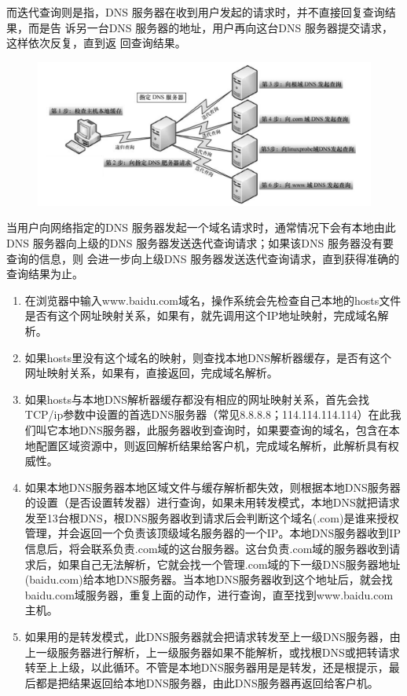 而迭代查询则是指，DNS 服务器在收到用户发起的请求时，并不直接回复查询结果，而是告
诉另一台DNS 服务器的地址，用户再向这台DNS 服务器提交请求，这样依次反复，直到返
回查询结果。
\begin{figure}[H]
	\centering
	\includegraphics[width=0.8\linewidth]{image/DNS}
\end{figure}
当用户向网络指定的DNS 服务器发起一个域名请求时，通常情况下会有本地由此DNS
服务器向上级的DNS 服务器发送迭代查询请求；如果该DNS 服务器没有要查询的信息，则
会进一步向上级DNS 服务器发送迭代查询请求，直到获得准确的查询结果为止。

\begin{enumerate}
	\item 在浏览器中输入www.baidu.com域名，操作系统会先检查自己本地的hosts文件是否有这个网址映射关系，如果有，就先调用这个IP地址映射，完成域名解析。
	
	\item  如果hosts里没有这个域名的映射，则查找本地DNS解析器缓存，是否有这个网址映射关系，如果有，直接返回，完成域名解析。
	
	\item  如果hosts与本地DNS解析器缓存都没有相应的网址映射关系，首先会找TCP/ip参数中设置的首选DNS服务器（常见8.8.8.8；114.114.114.114）在此我们叫它本地DNS服务器，此服务器收到查询时，如果要查询的域名，包含在本地配置区域资源中，则返回解析结果给客户机，完成域名解析，此解析具有权威性。
	
	\item  如果本地DNS服务器本地区域文件与缓存解析都失效，则根据本地DNS服务器的设置（是否设置转发器）进行查询，如果未用转发模式，本地DNS就把请求发至13台根DNS，根DNS服务器收到请求后会判断这个域名(.com)是谁来授权管理，并会返回一个负责该顶级域名服务器的一个IP。本地DNS服务器收到IP信息后，将会联系负责.com域的这台服务器。这台负责.com域的服务器收到请求后，如果自己无法解析，它就会找一个管理.com域的下一级DNS服务器地址(baidu.com)给本地DNS服务器。当本地DNS服务器收到这个地址后，就会找baidu.com域服务器，重复上面的动作，进行查询，直至找到www.baidu.com主机。
	
	\item  如果用的是转发模式，此DNS服务器就会把请求转发至上一级DNS服务器，由上一级服务器进行解析，上一级服务器如果不能解析，或找根DNS或把转请求转至上上级，以此循环。不管是本地DNS服务器用是是转发，还是根提示，最后都是把结果返回给本地DNS服务器，由此DNS服务器再返回给客户机。
\end{enumerate}
